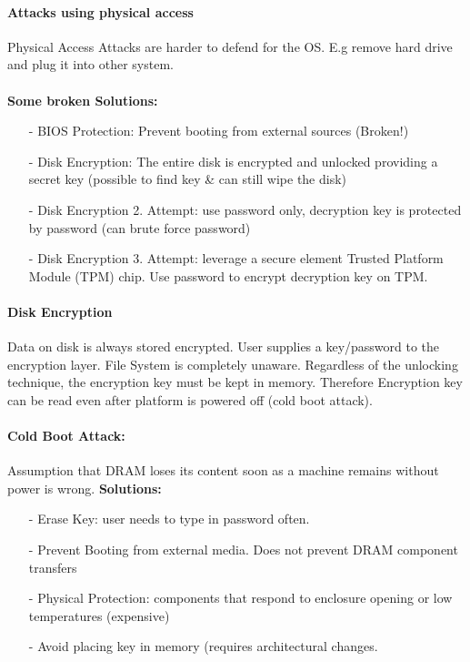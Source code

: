 \paragraph{Attacks using physical access}
Physical Access Attacks are harder to defend for the OS. E.g remove hard drive and plug it into other system.\\
\\
\textbf{Some broken Solutions: }
\begin{itemize}
    \item[-]BIOS Protection: Prevent booting from external sources (Broken!)
    \item[-]Disk Encryption: The entire disk is encrypted and unlocked providing a secret key (possible to find key & can still wipe the disk)
    \item[-]Disk Encryption 2. Attempt: use password only, decryption key is protected by password (can brute force password)
    \item[-]Disk Encryption 3. Attempt: leverage a secure element Trusted Platform Module (TPM) chip. Use password to encrypt decryption key on TPM.
\end{itemize}

\paragraph{Disk Encryption}
Data on disk is always stored encrypted. User supplies a key/password to the encryption layer. File System is completely unaware. Regardless of the unlocking technique, the encryption key must be kept in memory. Therefore Encryption key can be read even after platform is powered off (cold boot attack).\\
\paragraph{Cold Boot Attack: } Assumption that DRAM loses its content soon as a machine remains without power is wrong.
\textbf{Solutions: }
\begin{itemize}
    \item[-]Erase Key: user needs to type in password often.
    \item[-]Prevent Booting from external media. Does not prevent DRAM component transfers
    \item[-]Physical Protection: components that respond to enclosure opening or low temperatures (expensive)
    \item[-]Avoid placing key in memory (requires architectural changes.
\end{itemize}{}

